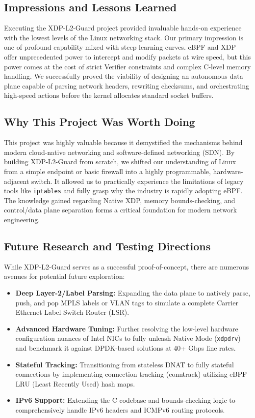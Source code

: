 \documentclass[11pt,a4paper]{article}
\begin{document}
\subsection{Impressions and Lessons Learned}

Executing the XDP-L2-Guard project provided invaluable hands-on experience with the lowest levels of the Linux networking stack.
Our primary impression is one of profound capability mixed with steep learning curves.
eBPF and XDP offer unprecedented power to intercept and modify packets at wire speed, but this power comes at the cost of strict Verifier constraints and complex C-level memory handling.
We successfully proved the viability of designing an autonomous data plane capable of parsing network headers, rewriting checksums, and orchestrating high-speed actions before the kernel allocates standard socket buffers.

\subsection{Why This Project Was Worth Doing}

This project was highly valuable because it demystified the mechanisms behind modern cloud-native networking and software-defined networking (SDN).
By building XDP-L2-Guard from scratch, we shifted our understanding of Linux from a simple endpoint or basic firewall into a highly programmable, hardware-adjacent switch.
It allowed us to practically experience the limitations of legacy tools like \texttt{iptables} and fully grasp why the industry is rapidly adopting eBPF.
The knowledge gained regarding Native XDP, memory bounds-checking, and control/data plane separation forms a critical foundation for modern network engineering.

\subsection{Future Research and Testing Directions}

While XDP-L2-Guard serves as a successful proof-of-concept, there are numerous avenues for potential future exploration:
\begin{itemize}
    \item \textbf{Deep Layer-2/Label Parsing:} Expanding the data plane to natively parse, push, and pop MPLS labels or VLAN tags to simulate a complete Carrier Ethernet Label Switch Router (LSR).
    \item \textbf{Advanced Hardware Tuning:} Further resolving the low-level hardware configuration nuances of Intel NICs to fully unleash Native Mode (\texttt{xdpdrv}) and benchmark it against DPDK-based solutions at 40+ Gbps line rates.
    \item \textbf{Stateful Tracking:} Transitioning from stateless DNAT to fully stateful connections by implementing connection tracking (conntrack) utilizing eBPF LRU (Least Recently Used) hash maps.
    \item \textbf{IPv6 Support:} Extending the C codebase and bounds-checking logic to comprehensively handle IPv6 headers and ICMPv6 routing protocols.
\end{itemize}
\end{document}
